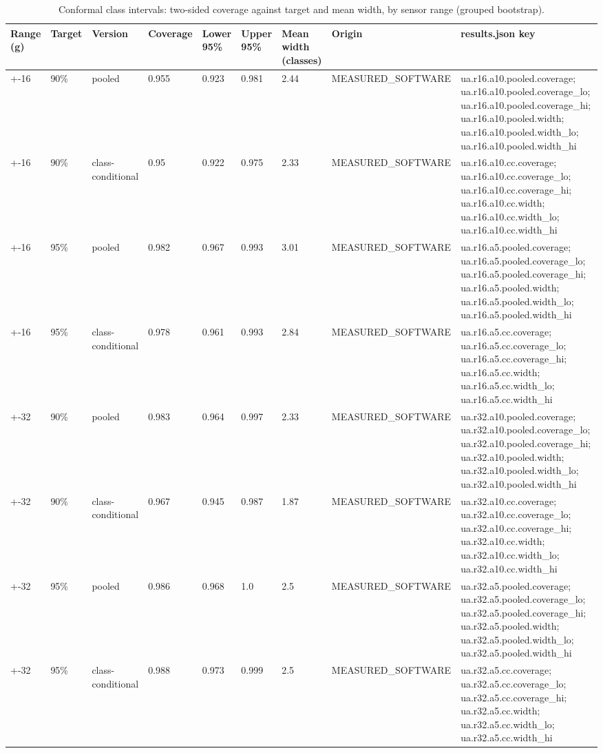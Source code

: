 \begin{table}[t]
\centering
\small
\caption{Conformal class intervals: two-sided coverage against target and mean width, by sensor range (grouped bootstrap).}
\label{tab:tab_interval_coverage}
\begin{tabular}{lllllllll}
\toprule
Range (g) & Target & Version & Coverage & Lower 95\% & Upper 95\% & Mean width (classes) & Origin & results.json key \\
\midrule
+-16 & 90\% & pooled & 0.955 & 0.923 & 0.981 & 2.44 & MEASURED\_SOFTWARE & ua.r16.a10.pooled.coverage; ua.r16.a10.pooled.coverage\_lo; ua.r16.a10.pooled.coverage\_hi; ua.r16.a10.pooled.width; ua.r16.a10.pooled.width\_lo; ua.r16.a10.pooled.width\_hi \\
+-16 & 90\% & class-conditional & 0.95 & 0.922 & 0.975 & 2.33 & MEASURED\_SOFTWARE & ua.r16.a10.cc.coverage; ua.r16.a10.cc.coverage\_lo; ua.r16.a10.cc.coverage\_hi; ua.r16.a10.cc.width; ua.r16.a10.cc.width\_lo; ua.r16.a10.cc.width\_hi \\
+-16 & 95\% & pooled & 0.982 & 0.967 & 0.993 & 3.01 & MEASURED\_SOFTWARE & ua.r16.a5.pooled.coverage; ua.r16.a5.pooled.coverage\_lo; ua.r16.a5.pooled.coverage\_hi; ua.r16.a5.pooled.width; ua.r16.a5.pooled.width\_lo; ua.r16.a5.pooled.width\_hi \\
+-16 & 95\% & class-conditional & 0.978 & 0.961 & 0.993 & 2.84 & MEASURED\_SOFTWARE & ua.r16.a5.cc.coverage; ua.r16.a5.cc.coverage\_lo; ua.r16.a5.cc.coverage\_hi; ua.r16.a5.cc.width; ua.r16.a5.cc.width\_lo; ua.r16.a5.cc.width\_hi \\
+-32 & 90\% & pooled & 0.983 & 0.964 & 0.997 & 2.33 & MEASURED\_SOFTWARE & ua.r32.a10.pooled.coverage; ua.r32.a10.pooled.coverage\_lo; ua.r32.a10.pooled.coverage\_hi; ua.r32.a10.pooled.width; ua.r32.a10.pooled.width\_lo; ua.r32.a10.pooled.width\_hi \\
+-32 & 90\% & class-conditional & 0.967 & 0.945 & 0.987 & 1.87 & MEASURED\_SOFTWARE & ua.r32.a10.cc.coverage; ua.r32.a10.cc.coverage\_lo; ua.r32.a10.cc.coverage\_hi; ua.r32.a10.cc.width; ua.r32.a10.cc.width\_lo; ua.r32.a10.cc.width\_hi \\
+-32 & 95\% & pooled & 0.986 & 0.968 & 1.0 & 2.5 & MEASURED\_SOFTWARE & ua.r32.a5.pooled.coverage; ua.r32.a5.pooled.coverage\_lo; ua.r32.a5.pooled.coverage\_hi; ua.r32.a5.pooled.width; ua.r32.a5.pooled.width\_lo; ua.r32.a5.pooled.width\_hi \\
+-32 & 95\% & class-conditional & 0.988 & 0.973 & 0.999 & 2.5 & MEASURED\_SOFTWARE & ua.r32.a5.cc.coverage; ua.r32.a5.cc.coverage\_lo; ua.r32.a5.cc.coverage\_hi; ua.r32.a5.cc.width; ua.r32.a5.cc.width\_lo; ua.r32.a5.cc.width\_hi \\

\end{tabular}
\end{table}
